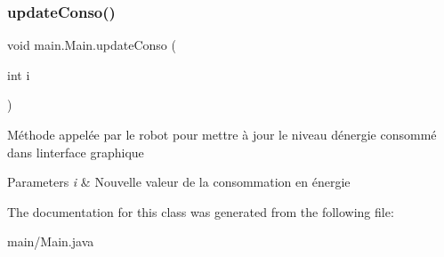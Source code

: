 \subsubsection{\texorpdfstring{update\+Conso()}{updateConso()}}
{\footnotesize\ttfamily void main.\+Main.\+update\+Conso (\begin{DoxyParamCaption}\item[{int}]{i }\end{DoxyParamCaption})}

Méthode appelée par le robot pour mettre à jour le niveau d\textquotesingle{}énergie consommé dans l\textquotesingle{}interface graphique 
\begin{DoxyParams}{Parameters}
{\em i} & Nouvelle valeur de la consommation en énergie \\
\hline
\end{DoxyParams}


The documentation for this class was generated from the following file\+:\begin{DoxyCompactItemize}
\item 
main/Main.\+java\end{DoxyCompactItemize}
